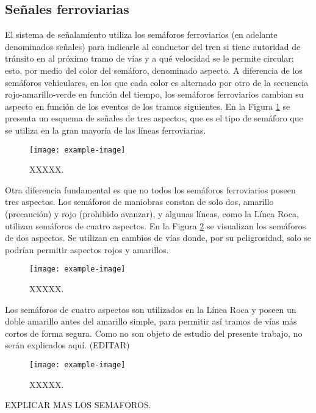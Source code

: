 \subsection{Señales ferroviarias}

El sistema de señalamiento utiliza los semáforos ferroviarios (en adelante denominados señales) para indicarle al conductor del tren si tiene autoridad de tránsito en al próximo tramo de vías y a qué velocidad se le permite circular; esto, por medio del color del semáforo, denominado aspecto. A diferencia de los semáforos vehiculares, en los que cada color es alternado por otro de la secuencia rojo-amarillo-verde en función del tiempo, los semáforos ferroviarios cambian su aspecto en función de los eventos de los tramos siguientes. En la Figura \ref{fig:signal_1} se presenta un esquema de señales de tres aspectos, que es el tipo de semáforo que se utiliza en la gran mayoría de las líneas ferroviarias.

    \begin{figure}[!h]
        \centering
        \texttt{[image: example-image]}
        \centering\caption{XXXXX.}
        \label{fig:signal_1}
    \end{figure}

Otra diferencia fundamental es que no todos los semáforos ferroviarios poseen tres aspectos. Los semáforos de maniobras constan de solo dos, amarillo (precaución) y rojo (prohibido avanzar), y algunas líneas, como la Línea Roca, utilizan semáforos de cuatro aspectos. En la Figura \ref{fig:signal_2} se visualizan los semáforos de dos aspectos. Se utilizan en cambios de vías donde, por su peligrosidad, solo se podrían permitir aspectos rojos y amarillos.

    \begin{figure}[!h]
        \centering
        \texttt{[image: example-image]}
        \centering\caption{XXXXX.}
        \label{fig:signal_2}
    \end{figure}

Los semáforos de cuatro aspectos son utilizados en la Línea Roca y poseen un doble amarillo antes del amarillo simple, para permitir así tramos de vías más cortos de forma segura. Como no son objeto de estudio del presente trabajo, no serán explicados aquí. (EDITAR)

    \begin{figure}[!h]
        \centering
        \texttt{[image: example-image]}
        \centering\caption{XXXXX.}
        \label{fig:signal_3}
    \end{figure}

EXPLICAR MAS LOS SEMAFOROS.
